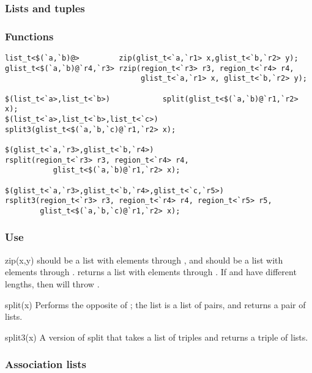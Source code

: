 \subsubsection*{Lists and tuples}
\subsubsection*{Functions}
\begin{verbatim}
list_t<$(`a,`b)@>         zip(glist_t<`a,`r1> x,glist_t<`b,`r2> y);
glist_t<$(`a,`b)@`r4,`r3> rzip(region_t<`r3> r3, region_t<`r4> r4,
                               glist_t<`a,`r1> x, glist_t<`b,`r2> y);

$(list_t<`a>,list_t<`b>)            split(glist_t<$(`a,`b)@`r1,`r2> x);
$(list_t<`a>,list_t<`b>,list_t<`c>) split3(glist_t<$(`a,`b,`c)@`r1,`r2> x);

$(glist_t<`a,`r3>,glist_t<`b,`r4>) 
rsplit(region_t<`r3> r3, region_t<`r4> r4,
           glist_t<$(`a,`b)@`r1,`r2> x);

$(glist_t<`a,`r3>,glist_t<`b,`r4>,glist_t<`c,`r5>) 
rsplit3(region_t<`r3> r3, region_t<`r4> r4, region_t<`r5> r5,
        glist_t<$(`a,`b,`c)@`r1,`r2> x);
\end{verbatim}
  
\subsubsection*{Use}

\begin{defun}{zip}{(x,y)}
 should be a list with elements  through , and
 should be a list with elements  through .
 returns a list with elements 
through .  If  and  have
different lengths, then  will throw
.
\end{defun}

\begin{defun}{split}{(x)}
Performs the opposite of ; the list  is a list of
pairs, and  returns a pair of lists.
\end{defun}

\begin{defun}{split3}{(x)}
A version of split that takes a list of triples and returns a triple
of lists.
\end{defun}

  
\subsubsection*{Association lists}
